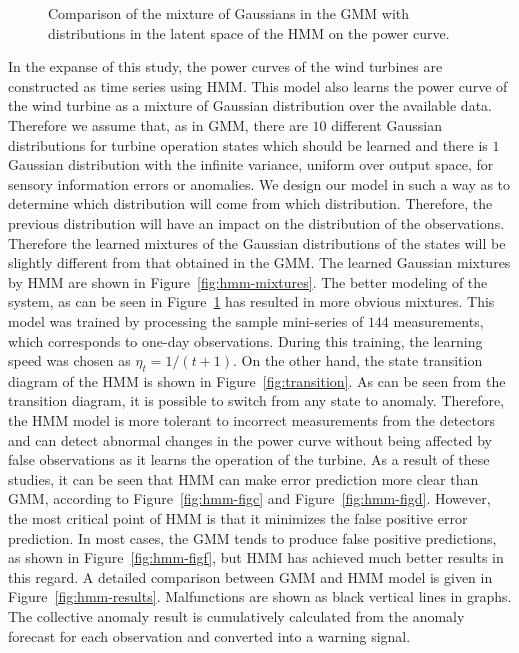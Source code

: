 \begin{figure}
\centering
    

    \caption{Comparison of the mixture of Gaussians in the GMM with distributions in the latent space of the HMM on the power curve.}
    \label{fig:mixtures}
\end{figure}

In the expanse of this study, the power curves of the wind turbines are constructed as time series using HMM. 
This model also learns the power curve of the wind turbine as a mixture of Gaussian distribution over the available data. 
Therefore we assume that, as in GMM, there are $10$ different Gaussian distributions for turbine operation states which should be learned and there is $1$ Gaussian distribution with the infinite variance, uniform over output space, for sensory information errors or anomalies. 
We design our model in such a way as to determine which distribution will come from which distribution.
Therefore, the previous distribution will have an impact on the distribution of the observations. Therefore the learned mixtures of the Gaussian distributions of the states will be slightly different from that obtained in the GMM.
The learned Gaussian mixtures by HMM are shown in Figure~\ref{fig:hmm-mixtures}. 
The better modeling of the system, as can be seen in Figure~\ref{fig:mixtures} has resulted in more obvious mixtures.
This model was trained by processing the sample mini-series of $144$ measurements, which corresponds to one-day observations. 
During this training, the learning speed was chosen as $\eta_t=1/\left(t+1\right)$. 
On the other hand, the state transition diagram of the HMM is shown in Figure~\ref{fig:transition}.
As can be seen from the transition diagram, it is possible to switch from any state to anomaly.
Therefore, the HMM model is more tolerant to incorrect measurements from the detectors and can detect abnormal changes in the power curve without being affected by false observations as it learns the operation of the turbine.
As a result of these studies, it can be seen that HMM can make error prediction more clear than GMM, according to Figure~\ref{fig:hmm-figc} and Figure~\ref{fig:hmm-figd}. However, the most critical point of HMM is that it minimizes the false positive error prediction. In most cases, the GMM tends to produce false positive predictions, as shown in Figure~\ref{fig:hmm-figf}, but HMM has achieved much better results in this regard. A detailed comparison between GMM and HMM model is given in Figure~\ref{fig:hmm-results}. Malfunctions are shown as black vertical lines in graphs. The collective anomaly result is cumulatively calculated from the anomaly forecast for each observation and converted into a warning signal.

